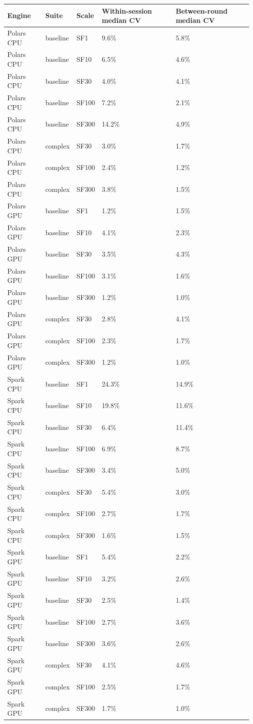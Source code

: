 \begin{tabular}{lllll}
\toprule
Engine & Suite & Scale & Within-session median CV & Between-round median CV \\
\midrule
Polars CPU & baseline & SF1 & 9.6\% & 5.8\% \\
Polars CPU & baseline & SF10 & 6.5\% & 4.6\% \\
Polars CPU & baseline & SF30 & 4.0\% & 4.1\% \\
Polars CPU & baseline & SF100 & 7.2\% & 2.1\% \\
Polars CPU & baseline & SF300 & 14.2\% & 4.9\% \\
Polars CPU & complex & SF30 & 3.0\% & 1.7\% \\
Polars CPU & complex & SF100 & 2.4\% & 1.2\% \\
Polars CPU & complex & SF300 & 3.8\% & 1.5\% \\
Polars GPU & baseline & SF1 & 1.2\% & 1.5\% \\
Polars GPU & baseline & SF10 & 4.1\% & 2.3\% \\
Polars GPU & baseline & SF30 & 3.5\% & 4.3\% \\
Polars GPU & baseline & SF100 & 3.1\% & 1.6\% \\
Polars GPU & baseline & SF300 & 1.2\% & 1.0\% \\
Polars GPU & complex & SF30 & 2.8\% & 4.1\% \\
Polars GPU & complex & SF100 & 2.3\% & 1.7\% \\
Polars GPU & complex & SF300 & 1.2\% & 1.0\% \\
Spark CPU & baseline & SF1 & 24.3\% & 14.9\% \\
Spark CPU & baseline & SF10 & 19.8\% & 11.6\% \\
Spark CPU & baseline & SF30 & 6.4\% & 11.4\% \\
Spark CPU & baseline & SF100 & 6.9\% & 8.7\% \\
Spark CPU & baseline & SF300 & 3.4\% & 5.0\% \\
Spark CPU & complex & SF30 & 5.4\% & 3.0\% \\
Spark CPU & complex & SF100 & 2.7\% & 1.7\% \\
Spark CPU & complex & SF300 & 1.6\% & 1.5\% \\
Spark GPU & baseline & SF1 & 5.4\% & 2.2\% \\
Spark GPU & baseline & SF10 & 3.2\% & 2.6\% \\
Spark GPU & baseline & SF30 & 2.5\% & 1.4\% \\
Spark GPU & baseline & SF100 & 2.7\% & 3.6\% \\
Spark GPU & baseline & SF300 & 3.6\% & 2.6\% \\
Spark GPU & complex & SF30 & 4.1\% & 4.6\% \\
Spark GPU & complex & SF100 & 2.5\% & 1.7\% \\
Spark GPU & complex & SF300 & 1.7\% & 1.0\% \\
\bottomrule
\end{tabular}
